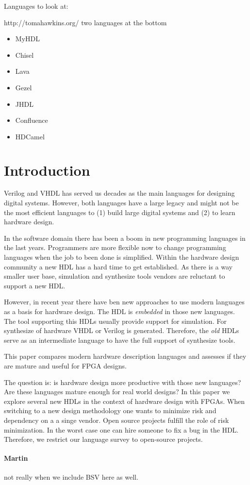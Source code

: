 \documentclass[a4paper, conference]{IEEEtran}
\newcommand{\comment}[3]{\paragraph*{\textbf{#1}}{\color{#3}#2}}
\newcommand{\martin}[1]{\comment{Martin}{#1}{Blue}}
\begin{document}
Languages to look at:

http://tomahawkins.org/ two languages at the bottom

\begin{itemize}
   \item MyHDL
   \item Chisel
   \item Lava
   \item Gezel
   \item JHDL
   \item Confluence
   \item HDCamel
\end{itemize}

\section{Introduction}

Verilog and VHDL has served us decades as the main languages for designing
digital systems. However, both languages have a large legacy and might not be
the most efficient languages to (1) build large digital systems and (2) to learn
hardware design.

In the software domain there has been a boom in new programming languages
in the last years. Programmers are more flexible now to change programming
languages when the job to been done is simplified. Within the hardware design
community a new HDL has a hard time to get established. As there is a way
smaller user base, simulation and synthesize tools vendors are reluctant to
support a new HDL.

However, in recent year there have ben new approaches to use modern
languages as a basis for hardware design. The HDL is \emph{embedded}
in those new languages. The tool supporting this HDLs usually provide
support for simulation. For synthesize of hardware VHDL or Verilog is
generated. Therefore, the \emph{old} HDLs serve as an intermediate
language to have the full support of synthesize tools.

This paper compares modern hardware description languages and
assesses if they are mature and useful for FPGA designs.

The question is: is hardware design more productive with those new
languages? Are these languages mature enough for real world designs?
In this paper we explore several new HDLs in the context of hardware
design with FPGAs. When switching to a new design methodology one
wants to minimize risk and dependency on a a singe vendor. Open source
projects fulfill the role of risk minimization. In the worst case one can hire
someone to fix a bug in the HDL. Therefore, we restrict our language survey
to open-source projects.
\martin{not really when we include BSV here as well.}
\end{document}
